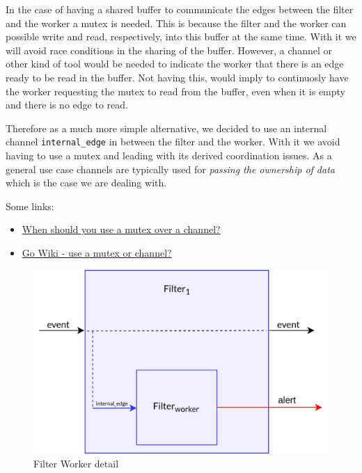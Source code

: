 In the case of having a shared buffer to communicate the edges between the filter and the worker a mutex is needed. This is because the filter and the worker can possible write and read, respectively, into this buffer at the same time. With it we will avoid race conditions in the sharing of the buffer. However, a channel or other kind of tool would be needed to indicate the worker that there is an edge ready to be read in the buffer. Not having this, would imply to continuosly have the worker requesting the mutex to read from the buffer, even when it is empty and there is no edge to read. 

Therefore as a much more simple alternative, we decided to use an internal channel \texttt{internal\_edge} in between the filter and the worker. With it we avoid having to use a mutex and leading with its derived coordination issues. As a general use case channels are typically used for \emph{passing the ownership of data} which is the case we are dealing with.

Some links:
\begin{itemize}
  \item \href{https://stackoverflow.com/questions/47312029/when-should-you-use-a-mutex-over-a-channel}{When should you use a mutex over a channel?}
  \item \href{https://go.dev/wiki/MutexOrChannel}{Go Wiki - use a mutex or channel?}
\end{itemize}


\begin{figure}[H]
  \centering
  \includegraphics[scale = 0.7]{images/3-Engine/filter-worker.png}
  \caption{Filter Worker detail}
  \label{img:pipeline-schema}
\end{figure}


